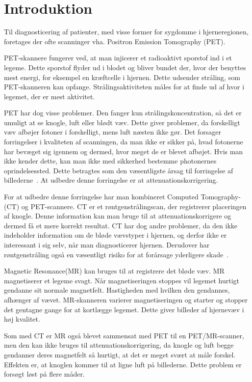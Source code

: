 \section{Introduktion}

Til diagnosticering af patienter, med visse former for sygdomme i
hjerneregionen, foretages der ofte scanninger vha. Positron Emission
Tomography (PET).

PET-skannere fungerer ved, at man injicerer et radioaktivt sporstof
ind i et legeme. Dette sporstof flyder ud i blodet og bliver bundet
der, hvor der benyttes mest energi, for eksempel en kræftcelle i
hjernen. Dette udsender stråling, som PET-skanneren kan opfange.
Strålingsaktiviteten måles for at finde ud af hvor i legemet, der er
mest aktivitet.

PET har dog visse problemer. Den fanger kun strålingskoncentration,
så det er umuligt at se knogle, luft eller blødt væv. Dette giver
problemer, da forskelligt væv afbøjer fotoner i forskelligt,
mens luft næsten ikke gør. Det forsager forringelser i kvaliteten
af scanningen, da man ikke er sikker på, hvad fotonerne har bevæget
sig igennem og dermed, hvor meget de er blevet afbøjet. Hvis man ikke
kender dette, kan man ikke med sikkerhed bestemme photonernes oprindelsessted.
Dette betragtes som den væsentligste årsag til forringelse af
billederne~\cite{vigtighedAfAttenuation}. At udbedre denne forringelse er at
attenuationskorrigering.

For at udbedre denne forringelse har man kombineret Computed
Tomo\-graphy- (CT) og PET-scannere. CT er et røntgenstrålingscan,
der registrerer placeringen af knogle. Denne information kan man bruge
til at attenuationskorrigere og dermed få et mere korrekt resultat.
CT har dog andre problemer, da den ikke indeholder information om de
bløde vævstyper i hjernen, og derfor ikke er interessant i sig selv, når
man diagnosticerer hjernen. Derudover har røntgenstråling også
en væsentligt risiko for at forårsage yderligere skade~\cite{skadeligCT}.

Magnetic Resonance(MR) kan bruges til at registrere det bløde væv.
MR magnetiserer et legeme svagt. Når magnetiseringen stoppes vil legemet hurtigt
gendanne sit normale magnetfelt. Hastigheden med hvilken den gendannes,
afhænger af vævet. MR-skanneren varierer magnetiseringen og starter og
stopper det gentagne gange for at kortlægge legemet. Dette giver billeder
af hjernevæv i høj kvalitet.

Som med CT er MR også blevet sammensat med PET til en PET/MR-scanner,
men den kan ikke bruges til attenuationskorrigering, da knogle og luft
begge gendanner deres magnetfelt så hurtigt, at det er meget svært at
måle forskel. Effekten er, at knoglen kommer til at ligne luft på
billederne. Dette problem er forsøgt løst på flere måder.

